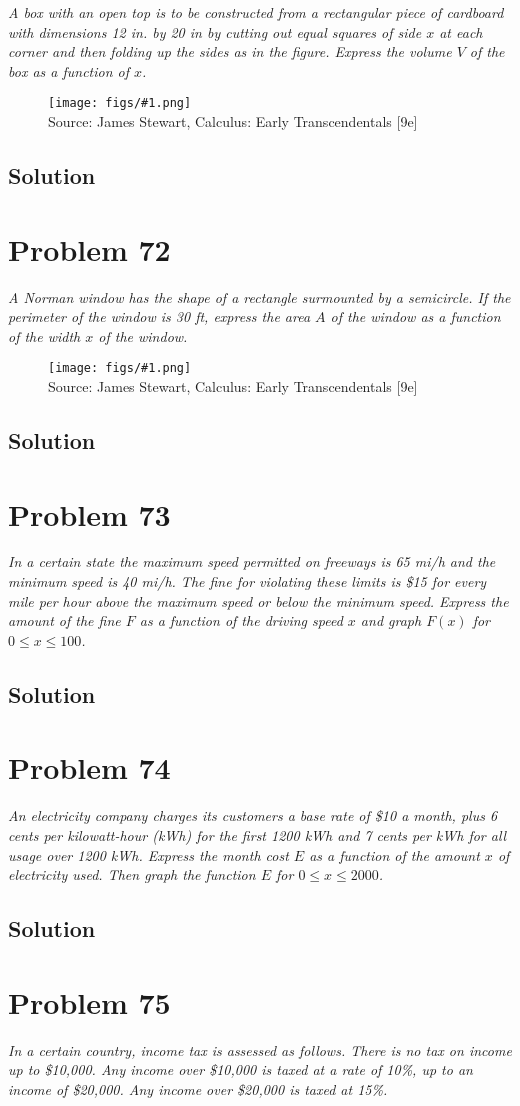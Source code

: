 \documentclass[11pt]{article}
\newcommand{\soln}{\subsection*}
\newcommand{\qn}{\textit}
\newcommand{\imagesource}[1]{{\footnotesize Source: #1}}
\newcommand{\imgqn}[1]{
	\begin{figure}[H]
		\centering
		\texttt{[image: figs/\#1.png]}\\
		\imagesource{James Stewart, Calculus: Early Transcendentals [9e]}
	\end{figure}
}
\begin{document}
\qn{A box with an open top is to be constructed from a rectangular piece of cardboard with dimensions 12 in. by 20 in by cutting out equal squares of side $x$ at each corner and then folding up the sides as in the figure. Express the volume $V$ of the box as a function of $x$.}

\imgqn{1.1.71}

\soln{Solution}

\section*{Problem 72}

\qn{A Norman window has the shape of a rectangle surmounted by a semicircle. If the perimeter of the window is 30 ft, express the area $A$ of the window as a function of the width $x$ of the window.}

\imgqn{1.1.72}

\soln{Solution}

\section*{Problem 73}

\qn{In a certain state the maximum speed permitted on freeways is 65 mi/h and the minimum speed is 40 mi/h. The fine for violating these limits is \$15 for every mile per hour above the maximum speed or below the minimum speed. Express the amount of the fine $F$ as a function of the driving speed $x$ and graph $F(x)$ for $0 \le x \le 100$.}

\soln{Solution}

\section*{Problem 74}

\qn{An electricity company charges its customers a base rate of \$10 a month, plus 6 cents per kilowatt-hour (kWh) for the first 1200 kWh and 7 cents per kWh for all usage over 1200 kWh. Express the month cost $E$ as a function of the amount $x$ of electricity used. Then graph the function $E$ for $0 \le x \le 2000$.}

\soln{Solution}

\section*{Problem 75}

\qn{In a certain country, income tax is assessed as follows. There is no tax on income up to \$10,000. Any income over \$10,000 is taxed at a rate of 10\%, up to an income of \$20,000. Any income over \$20,000 is taxed at 15\%.}
\end{document}
